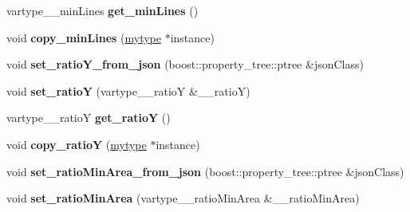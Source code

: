\begin{DoxyCompactItemize}
vartype\+\_\+\+\_\+min\+Lines {\bfseries get\+\_\+min\+Lines} ()
\item 
\mbox{\label{classfilter_1_1_algos_1_1_i_d_plate_identifier_a06354f9ca9cfd78e7556a08c9cfb69cd}} 
void {\bfseries copy\+\_\+min\+Lines} (\hyperlink{classfilter_1_1_algos_1_1_i_d_plate_identifier}{mytype} $\ast$instance)
\item 
\mbox{\label{classfilter_1_1_algos_1_1_i_d_plate_identifier_a406ae4f5da396e1184fd4740afc98687}} 
void {\bfseries set\+\_\+ratio\+Y\+\_\+from\+\_\+json} (boost\+::property\+\_\+tree\+::ptree \&json\+Class)
\item 
\mbox{\label{classfilter_1_1_algos_1_1_i_d_plate_identifier_a7f47586448147e2caea7c27b619c1e9c}} 
void {\bfseries set\+\_\+ratioY} (vartype\+\_\+\+\_\+ratioY \&\+\_\+\+\_\+ratioY)
\item 
\mbox{\label{classfilter_1_1_algos_1_1_i_d_plate_identifier_af441b6411d5386d6752c63d49376ab52}} 
vartype\+\_\+\+\_\+ratioY {\bfseries get\+\_\+ratioY} ()
\item 
\mbox{\label{classfilter_1_1_algos_1_1_i_d_plate_identifier_ae9fb4ae252f1d7d4d26cbd10335d893a}} 
void {\bfseries copy\+\_\+ratioY} (\hyperlink{classfilter_1_1_algos_1_1_i_d_plate_identifier}{mytype} $\ast$instance)
\item 
\mbox{\label{classfilter_1_1_algos_1_1_i_d_plate_identifier_ace777a399097849804f2d339b30a5b7a}} 
void {\bfseries set\+\_\+ratio\+Min\+Area\+\_\+from\+\_\+json} (boost\+::property\+\_\+tree\+::ptree \&json\+Class)
\item 
\mbox{\label{classfilter_1_1_algos_1_1_i_d_plate_identifier_ad15ea0a66206a0d8d01dac32f8a2800d}} 
void {\bfseries set\+\_\+ratio\+Min\+Area} (vartype\+\_\+\+\_\+ratio\+Min\+Area \&\+\_\+\+\_\+ratio\+Min\+Area)
\item 
\mbox{\label{classfilter_1_1_algos_1_1_i_d_plate_identifier_a7962c2926f2fd58145288c3e8d556883}} 

\end{DoxyCompactItemize}
